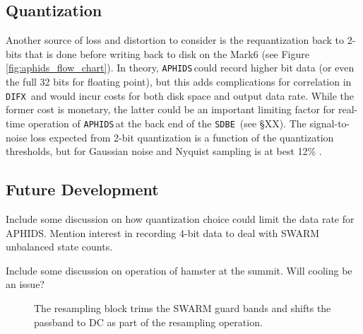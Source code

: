 \documentclass[11pt,preprint]{aastex}
\newcommand{\SDBE}{\texttt{SDBE}}
\newcommand{\APHIDS}{\texttt{APHIDS}}
\newcommand{\DIFX}{\texttt{DIFX}}
\begin{document}
\subsection{Quantization}
Another source of loss and distortion to consider is the requantization back to 2-bits that is done
before writing back to disk on the Mark6 (see Figure \ref{fig:aphids_flow_chart}).  In theory, \APHIDS\,could 
record higher bit data (or even the full 32 bits for floating point), but this adds complications for 
correlation 
in \DIFX\ and would incur costs for both disk space and output data rate.  While the former cost is monetary, the 
latter could be an important limiting factor for real-time operation of \APHIDS\,at the back end of the \SDBE\,
(see \S XX).  The signal-to-noise loss expected from 2-bit quantization is a function of the quantization 
thresholds, but for Gaussian noise and Nyquist sampling is at best 12\% \citep{cooper70,thompson01}.

\subsection{Future Development}

Include some discussion on how quantization choice could limit the data rate for APHIDS. 
Mention interest in recording 4-bit data to deal with SWARM unbalanced state counts.

Include some discussion on operation of hamster at the summit.  Will cooling be an issue?


\begin{figure}
\centering
{}
\label{fig:resampling_block}
\caption{The resampling block trims the SWARM guard bands and shifts the passband to DC as part of the 
resampling operation.}
\end{figure}
\end{document}
